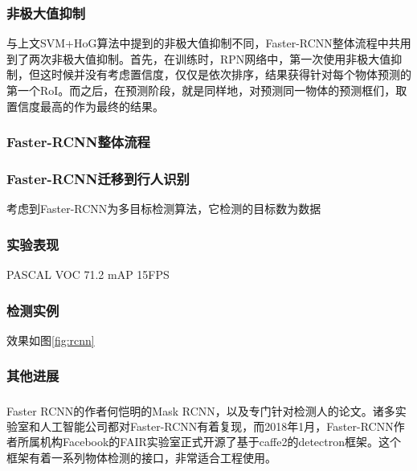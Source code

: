 \documentclass[12pt,a4paper,titlepage]{article}
\newcommand{\upcite}[1]{\textsuperscript{\textsuperscript{\cite{#1}}}}  %
\begin{document}
\subsubsection{非极大值抑制}
与上文SVM+HoG算法中提到的非极大值抑制不同，Faster-RCNN整体流程中共用到了两次非极大值抑制。首先，在训练时，RPN网络中，第一次使用非极大值抑制，但这时候并没有考虑置信度，仅仅是依次排序，结果获得针对每个物体预测的第一个RoI。而之后，在预测阶段，就是同样地，对预测同一物体的预测框们，取置信度最高的作为最终的结果。

\subsubsection{Faster-RCNN整体流程}

\subsubsection{Faster-RCNN迁移到行人识别}
考虑到Faster-RCNN为多目标检测算法，它检测的目标数为数据

\subsubsection{实验表现}
PASCAL VOC 71.2 mAP   15FPS
\subsubsection{检测实例}
效果如图\ref{fig:rcnn}
\subsubsection{其他进展}
Faster RCNN的作者何恺明的Mask RCNN，以及专门针对检测人的论文\upcite{gkioxari2017detecting}。诸多实验室和人工智能公司都对Faster-RCNN有着复现，而2018年1月，Faster-RCNN作者所属机构Facebook的FAIR实验室正式开源了基于caffe2的detectron框架。这个框架有着一系列物体检测的接口，非常适合工程使用。
\end{document}

